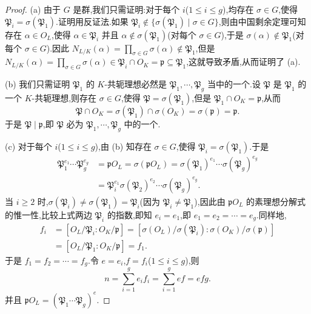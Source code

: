 \begin{proof}
(a) 由于 $G$ 是群,我们只需证明:对于每个 $i$($1\leqslant i\leqslant g$),均存在 $\sigma\in G$,使得 $\mathfrak{P}_i=\sigma(\mathfrak{P}_1)$.证明用反证法.如果 $\mathfrak{P}_i\notin\{\sigma(\mathfrak{P}_1)\mid\sigma\in G\}$,则由中国剩余定理可知存在 $\alpha\in O_L$,使得 $\alpha\in\mathfrak{P}_i$ 并且 $\alpha\notin\sigma(\mathfrak{P}_1)$(对每个 $\sigma\in G$),于是 $\sigma(\alpha)\notin\mathfrak{P}_1$(对每个 $\sigma\in G$).因此 $N_{L/K}(\alpha)=\prod_{\sigma\in G}\sigma(\alpha)\notin\mathfrak{P}_1$,但是 $N_{L/K}(\alpha)=\prod_{\sigma\in G}\sigma(\alpha)\in\mathfrak{P}_i\cap O_K=\mathfrak{p}\subseteq\mathfrak{P}_1$,这就导致矛盾,从而证明了 (a).

(b) 我们只需证明 $\mathfrak{P}_1$ 的 $K$-共轭理想必然是 $\mathfrak{P}_1,\cdots,\mathfrak{P}_g$ 当中的一个.设 $\mathfrak{P}$ 是 $\mathfrak{P}_1$ 的一个 $K$-共轭理想,则存在 $\sigma\in G$,使得 $\mathfrak{P}=\sigma(\mathfrak{P}_1)$,但是 $\mathfrak{P}_1\cap O_K=\mathfrak{p}$,从而
\[
  \mathfrak{P}\cap O_K=\sigma(\mathfrak{P}_1)\cap\sigma(O_K)=\sigma(\mathfrak{p})=\mathfrak{p}.
\]
于是 $\mathfrak{P}\mid\mathfrak{p}$,即 $\mathfrak{P}$ 必为 $\mathfrak{P}_1,\cdots,\mathfrak{P}_g$ 中的一个.

(c) 对于每个 $i$($1\leqslant i\leqslant g$),由 (b) 知存在 $\sigma\in G$,使得 $\mathfrak{P}_i=\sigma(\mathfrak{P}_1)$.于是
\begin{align*}
  \mathfrak{P}_1^{e_1}\cdots\mathfrak{P}_g^{e_g}
  &=\mathfrak{p}O_L=\sigma(\mathfrak{p}O_L)=\sigma(\mathfrak{P}_1)^{e_1}\cdots\sigma(\mathfrak{P}_g)^{e_g}\\
  &=\mathfrak{P}_i^{e_1}\sigma(\mathfrak{P}_2)^{e_2}\cdots\sigma(\mathfrak{P}_g)^{e_g}.
\end{align*}
当 $i\geqslant 2$ 时,$\sigma(\mathfrak{P}_i)\neq\sigma(\mathfrak{P}_1)=\mathfrak{P}_i$(因为 $\mathfrak{P}_i\neq\mathfrak{P}_1$),因此由 $\mathfrak{p}O_L$ 的素理想分解式的惟一性,比较上式两边 $\mathfrak{P}_i$ 的指数,即知 $e_i=e_1$,即 $e_1=e_2=\cdots=e_g$.同样地,
\begin{align*}
  f_i&=[O_L/\mathfrak{P}_i:O_K/\mathfrak{p}]
  =[\sigma(O_L)/\sigma(\mathfrak{P}_i):\sigma(O_K)/\sigma(\mathfrak{p})]\\
  &=[O_L/\mathfrak{P}_1:O_K/\mathfrak{p}]=f_1.
\end{align*}
于是 $f_1=f_2=\cdots=f_g$.令 $e=e_i$,$f=f_i$($1\leqslant i\leqslant g$),则
\[
  n=\sum_{i=1}^{g}e_if_i=\sum_{i=1}^{g}ef=efg.
\]
并且 $\mathfrak{p}O_L=(\mathfrak{P}_1\cdots\mathfrak{P}_g)^e$.


\end{proof}
